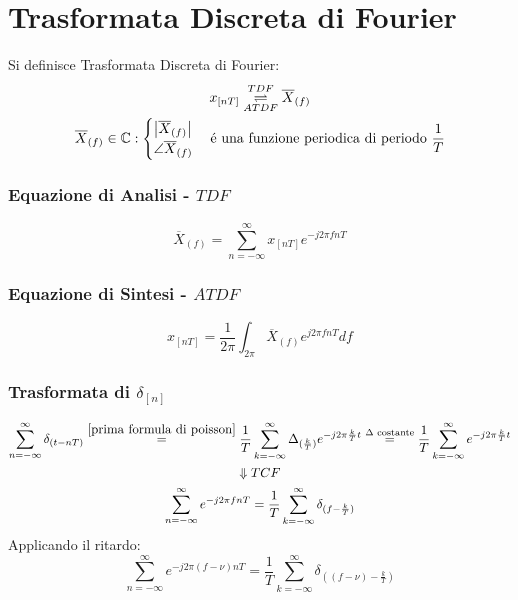 \section{Trasformata Discreta di Fourier}
    Si definisce Trasformata Discreta di Fourier:
    \begin{gather}
        x_{[nT]} \overunderset{TDF}{ATDF}{\rightleftharpoons} \overline{X}_{(f)} \nonumber \\
        \overline{X}_{(f)} \in \mathbb{C}: \begin{cases}
            \left| \overline{X}_{(f)} \right| \nonumber \\
            \angle \overline{X}_{(f)} \nonumber
        \end{cases} \text{é una funzione periodica di periodo }\frac{1}{T}\nonumber  
    \end{gather}
    \subsubsection{Equazione di Analisi - $TDF$} \label{TDF}
        \[
            \overline{X}_{(f)} = \sum_{n=-\infty}^{\infty} x_{[nT]}e^{-j2\pi fnT}
        \]
    \subsubsection{Equazione di Sintesi - $ATDF$} \label{ATDF}
        \[
            x_{[nT]} = \frac{1}{2\pi} \int_{2\pi} \overline{X}_{(f)}e^{j2\pi fnT} df
        \]
    \subsubsection{Trasformata di $\delta_{[n]}$}\label{tdf sequenza di delta}
        \begin{gather}
            \sum_{n=-\infty}^{\infty}\delta_{(t-nT)} \overset{\ref{prima formula di poisson}}{=} \frac{1}{T} \sum_{k=-\infty}^{\infty} \Delta_{(\frac{k}{T})}e^{-j2\pi \frac{k}{T}t} \overset{\Delta \text{ costante}}{=} \frac{1}{T} \sum_{k=-\infty}^{\infty} e^{-j2\pi \frac{k}{T}t} \nonumber \\
            \Downarrow TCF\nonumber \\
            \sum_{n=-\infty}^{\infty}e^{-j2\pi fnT} = \frac{1}{T} \sum_{k=-\infty}^{\infty} \delta_{(f-\frac{k}{T})}\nonumber
        \end{gather}
        Applicando il ritardo:
        \[
            \sum_{n=-\infty}^{\infty}e^{-j2\pi (f-\nu)nT} = \frac{1}{T} \sum_{k=-\infty}^{\infty} \delta_{((f-\nu)-\frac{k}{T})}
        \]
